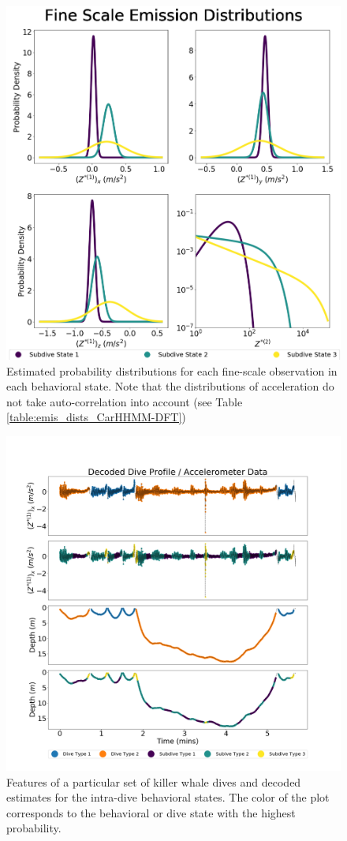 \begin{figure}[ht]
	\centering
	\includegraphics[width=5in]{../Plots/CarHHMM2-fine-emissions.png}
	\caption{Estimated probability distributions for each fine-scale observation in each behavioral state. Note that the distributions of acceleration do not take auto-correlation into account (see Table \ref{table:emis_dists_CarHHMM-DFT})}
	\label{fig:fine_emis}
\end{figure}

\begin{figure}[ht]
	\centering
	\includegraphics[width=5in]{../Plots/CarHHMM2_decoded_dives.png}
	\caption{Features of a particular set of killer whale dives and decoded estimates for the intra-dive behavioral states. The color of the plot corresponds to the behavioral or dive state with the highest probability.}
	\label{fig:labeled_dives}
\end{figure}

